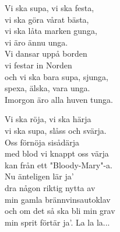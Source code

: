 \documentclass[a6paper, 10pt, twoside]{article}
\begin{document}
\begin{center}
\end{center}
\begin{lyrics}
Vi ska supa, vi ska festa,\\
vi ska göra vårat bästa,\\
vi ska låta marken gunga,\\
vi äro ännu unga.\\
Vi dansar uppå borden\\
vi festar in Norden\\
och vi ska bara supa, sjunga, \\
spexa, älska, vara unga.\\
Imorgon äro alla huven tunga.
\end{lyrics}
\begin{center}
\vspace{20pt}
\end{center}
\begin{lyrics}
Vi ska röja, vi ska härja\\
vi ska supa, slåss och svärja.\\
Oss förnöja sisådärja\\
med blod vi knappt oss värja\\
kan från ett "Bloody-Mary"-a.\\
Nu änteligen lär ja'\\
dra någon riktig nytta av\\
min gamla brännvinsautoklav\\
och om det så ska bli min grav\\
min sprit förtär ja'.
\vspace{5pt}
La la la...
\end{lyrics}
\end{document}
